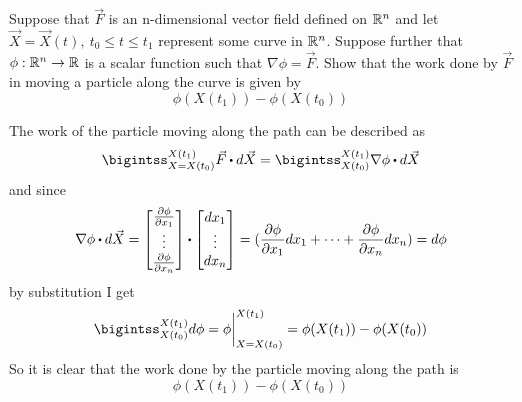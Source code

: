 \documentclass[titlepage]{article}
\begin{document}
\fancyhf{}
\cfoot{\thepage}

\begin{problem}{1}
Suppose that $\vec{F}$ is an n-dimensional vector field defined on $\mathbb{R}^n$ and let $\vec{X} = \vec{X}(t) , \ t_0 \leq t \leq t_1$ represent some curve in $\mathbb{R}^n$. Suppose further that $\phi:\mathbb{R}^n \rightarrow \mathbb{R}$ is a scalar function such that $\nabla\phi = \vec{F}$. Show that the work done by $\vec{F}$ in moving a particle along the curve is given by
$$\phi(X(t_1)) - \phi(X(t_0))$$
\end{problem}

\begin{solution}
The work of the particle moving along the path can be described as
$$ \bigintss_{X = X(t_0)}^{X(t_1)}\vec{F}\bigcdot d\vec{X} = \bigintss_{X(t_0)}^{X(t_1)}\nabla\phi \bigcdot d\vec{X}$$
and since
$$ \nabla\phi \bigcdot d\vec{X} = \begin{bmatrix}\frac{\p \phi}{\p x_1}\\ \vdots \\ \frac{\p \phi}{\p x_n}\end{bmatrix} \bigcdot \begin{bmatrix}dx_1 \\ \vdots \\ dx_n \end{bmatrix} = (\frac{\p \phi}{\p x_1}dx_1 + \cdots + \frac{\p \phi}{\p x_n}dx_n) = d\phi$$
by substitution I get
$$\bigintss_{X(t_0)}^{X(t_1)}d\phi = \phi\bigg\rvert_{X=X(t_0)}^{X(t_1)} = \phi(X(t_1)) - \phi(X(t_0))$$
So it is clear that the work done by the particle moving along the path is
$$\phi(X(t_1)) - \phi(X(t_0))$$
\end{solution}
\end{document}
